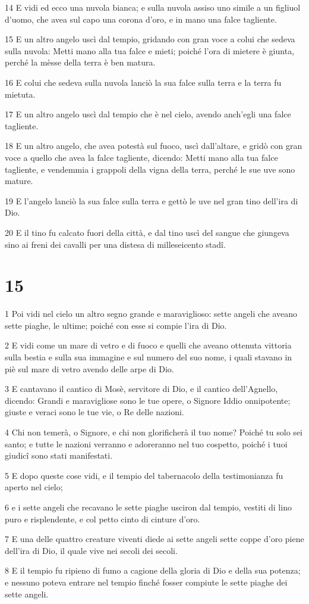 \par 14 E vidi ed ecco una nuvola bianca; e sulla nuvola assiso uno simile a un figliuol d'uomo, che avea sul capo una corona d'oro, e in mano una falce tagliente.
\par 15 E un altro angelo uscì dal tempio, gridando con gran voce a colui che sedeva sulla nuvola: Metti mano alla tua falce e mieti; poiché l'ora di mietere è giunta, perché la mèsse della terra è ben matura.
\par 16 E colui che sedeva sulla nuvola lanciò la sua falce sulla terra e la terra fu mietuta.
\par 17 E un altro angelo uscì dal tempio che è nel cielo, avendo anch'egli una falce tagliente.
\par 18 E un altro angelo, che avea potestà sul fuoco, uscì dall'altare, e gridò con gran voce a quello che avea la falce tagliente, dicendo: Metti mano alla tua falce tagliente, e vendemmia i grappoli della vigna della terra, perché le sue uve sono mature.
\par 19 E l'angelo lanciò la sua falce sulla terra e gettò le uve nel gran tino dell'ira di Dio.
\par 20 E il tino fu calcato fuori della città, e dal tino uscì del sangue che giungeva sino ai freni dei cavalli per una distesa di milleseicento stadî.

\chapter{15}

\par 1 Poi vidi nel cielo un altro segno grande e maraviglioso: sette angeli che aveano sette piaghe, le ultime; poiché con esse si compie l'ira di Dio.
\par 2 E vidi come un mare di vetro e di fuoco e quelli che aveano ottenuta vittoria sulla bestia e sulla sua immagine e sul numero del suo nome, i quali stavano in piè sul mare di vetro avendo delle arpe di Dio.
\par 3 E cantavano il cantico di Mosè, servitore di Dio, e il cantico dell'Agnello, dicendo: Grandi e maravigliose sono le tue opere, o Signore Iddio onnipotente; giuste e veraci sono le tue vie, o Re delle nazioni.
\par 4 Chi non temerà, o Signore, e chi non glorificherà il tuo nome? Poiché tu solo sei santo; e tutte le nazioni verranno e adoreranno nel tuo cospetto, poiché i tuoi giudicî sono stati manifestati.
\par 5 E dopo queste cose vidi, e il tempio del tabernacolo della testimonianza fu aperto nel cielo;
\par 6 e i sette angeli che recavano le sette piaghe usciron dal tempio, vestiti di lino puro e risplendente, e col petto cinto di cinture d'oro.
\par 7 E una delle quattro creature viventi diede ai sette angeli sette coppe d'oro piene dell'ira di Dio, il quale vive nei secoli dei secoli.
\par 8 E il tempio fu ripieno di fumo a cagione della gloria di Dio e della sua potenza; e nessuno poteva entrare nel tempio finché fosser compiute le sette piaghe dei sette angeli.

